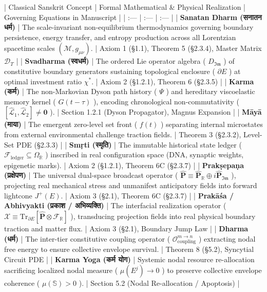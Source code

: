\documentclass[11pt,a4paper]{article}
\theoremstyle{definition}
\theoremstyle{remark}
\begin{document}
| Classical Sanskrit Concept | Formal Mathematical \& Physical Realization | Governing Equations in Manuscript |
| :--- | :--- | :--- |
| \textbf{Sanatan Dharm (सनातन धर्म)} | The scale-invariant non-equilibrium thermodynamics governing boundary persistence, energy transfer, and entropy production across all Lorentzian spacetime scales $(\mathcal{M}, g_{\mu\nu})$. | Axiom 1 (\S 1.1), Theorem 5 (\S 2.3.4), Master Matrix $\mathcal{D}_T$ |
| \textbf{Svadharma (स्वधर्म)} | The ordered Lie operator algebra ( $D_{\mathfrak{Im}}$ ) of constitutive boundary generators sustaining topological enclosure ( $\partial E$ ) at optimal investment ratio $\chi^*$. | Axiom 2 (\S 1.2.1), Theorem 6 (\S 2.3.5) |
| \textbf{Karma (कर्म)} | The non-Markovian Dyson path history ( $\Psi$ ) and hereditary viscoelastic memory kernel ( $G(t-\tau)$ ), encoding chronological non-commutativity ( $[\hat{\mathcal{L}}_1, \hat{\mathcal{L}}_2] \neq \mathbf{0}$ ). | Section 1.2.1 (Dyson Propagator), Magnus Expansion |
| \textbf{Māyā (माया)} | The emergent zero-level set front ( $f(t)$ ) separating internal microstates from external environmental challenge traction fields. | Theorem 3 (\S 2.3.2), Level-Set PDE (\S 2.3.3) |
| \textbf{Smṛti (स्मृति)} | The immutable historical state ledger ( $\mathcal{F}_{\text{ledger}} \subseteq \Omega_{\mathbb{R}}$ ) inscribed in real configuration space (DNA, synaptic weights, epigenetic marks). | Axiom 2 (\S 1.2.1), Theorem 6C (\S 2.3.7) |
| \textbf{Prakṣepaṇa (प्रक्षेपण)} | The universal dual-space broadcast operator ( $\hat{\mathbf{P}} \equiv \hat{\mathbf{P}}_{\mathbb{R}} \oplus i \hat{\mathbf{P}}_{\mathfrak{Im}}$ ), projecting real mechanical stress and unmanifest anticipatory fields into forward lightcone $J^+(E)$. | Axiom 3 (\S 2.1), Theorem 6C (\S 2.3.7) |
| \textbf{Prakāśa / Abhivyakti (प्रकाश / अभिव्यक्ति)} | The interfacial realization operator ( $\boldsymbol{\mathcal{X}} \equiv \mathrm{Tr}_{\partial E}[\hat{\mathbf{P}} \otimes \mathcal{F}_{\mathbb{R}}]$ ), transducing projection fields into real physical boundary traction and matter flux. | Axiom 3 (\S 2.1), Boundary Jump Law |
| \textbf{Dharma (धर्म)} | The inter-tier constitutive coupling operator ( $\mathcal{O}_{\text{coupling}}^{m \to n}$ ) extracting nodal free energy to ensure collective envelope survival. | Theorem 8 (\S 5.2), Syncytial Circuit PDE |
| \textbf{Karma Yoga (कर्म योग)} | Systemic nodal resource re-allocation sacrificing localized nodal measure ( $\mu(E^j) \to 0$ ) to preserve collective envelope coherence ( $\mu(\mathbb{S}) > 0$ ). | Section 5.2 (Nodal Re-allocation / Apoptosis) |
\end{document}
